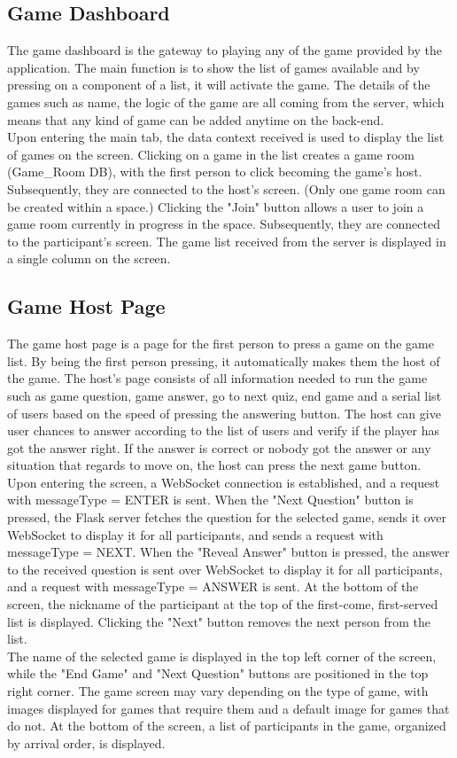 \documentclass[conference]{IEEEtran}
\begin{document}
    \subsection{Game Dashboard}
        The game dashboard is the gateway to playing any of the game provided by the application. The main function is to show the list of games available and by pressing on a component of a list, it will activate the game. The details of the games such as name, the logic of the game are all coming from the server, which means that any kind of game can be added anytime on the back-end.\\
        Upon entering the main tab, the data context received is used to display the list of games on the screen. Clicking on a game in the list creates a game room (Game\_Room DB), with the first person to click becoming the game's host. Subsequently, they are connected to the host's screen. (Only one game room can be created within a space.) Clicking the "Join" button allows a user to join a game room currently in progress in the space. Subsequently, they are connected to the participant's screen. The game list received from the server is displayed in a single column on the screen.

    \subsection{Game Host Page}
        The game host page is a page for the first person to press a game on the game list. By being the first person pressing, it automatically makes them the host of the game. The host’s page consists of all information needed to run the game such as game question, game answer, go to next quiz, end game and a serial list of users based on the speed of pressing the answering button. The host can give user chances to answer according to the list of users and verify if the player has got the answer right. If the answer is correct or nobody got the answer or any situation that regards to move on, the host can press the next game button.\\
        Upon entering the screen, a WebSocket connection is established, and a request with messageType = ENTER is sent. When the "Next Question" button is pressed, the Flask server fetches the question for the selected game, sends it over WebSocket to display it for all participants, and sends a request with messageType = NEXT. When the "Reveal Answer" button is pressed, the answer to the received question is sent over WebSocket to display it for all participants, and a request with messageType = ANSWER is sent. At the bottom of the screen, the nickname of the participant at the top of the first-come, first-served list is displayed. Clicking the "Next" button removes the next person from the list.\\
        The name of the selected game is displayed in the top left corner of the screen, while the "End Game" and "Next Question" buttons are positioned in the top right corner. The game screen may vary depending on the type of game, with images displayed for games that require them and a default image for games that do not. At the bottom of the screen, a list of participants in the game, organized by arrival order, is displayed.
\end{document}
